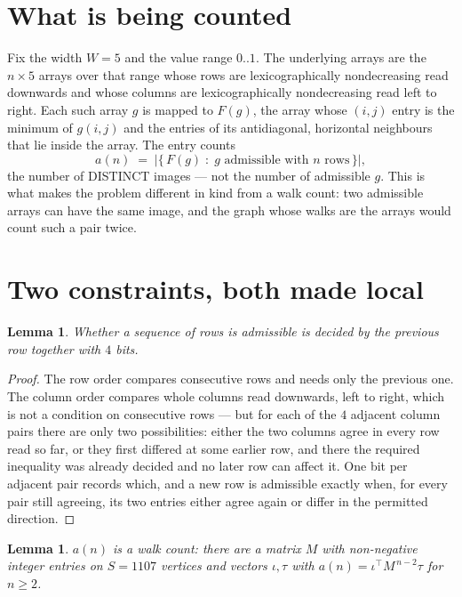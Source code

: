 \documentclass[11pt,a4paper]{article}
\theoremstyle{plain}
\newtheorem{lemma}[theorem]{Lemma}
\theoremstyle{definition}
\begin{document}
\section{What is being counted}

Fix the width $W=5$ and the value range $0..1$. The underlying arrays are the
$n\times5$ arrays over that range whose rows are lexicographically nondecreasing read downwards
and whose columns are lexicographically nondecreasing read left to right. Each such array $g$
is mapped to $F(g)$, the array whose $(i,j)$ entry is the minimum of $g(i,j)$ and the entries
of its antidiagonal, horizontal neighbours that lie inside the array. The entry counts
\[
a(n)\;=\;\bigl|\{\,F(g)\;:\;g\text{ admissible with }n\text{ rows}\,\}\bigr|,
\]
the number of DISTINCT images --- not the number of admissible $g$. This is what makes the
problem different in kind from a walk count: two admissible arrays can have the same image, and
the graph whose walks are the arrays would count such a pair twice.

\section{Two constraints, both made local}

\begin{lemma}\label{lem:local}
Whether a sequence of rows is admissible is decided by the previous row together with
$4$ bits.
\end{lemma}

\begin{proof}
The row order compares consecutive rows and needs only the previous one. The column order
compares whole columns read downwards, left to right, which is not a condition on consecutive
rows --- but for each of the $4$ adjacent column pairs there are only two possibilities:
either the two columns agree in every row read so far, or they first differed at some earlier
row, and there the required inequality was already decided and no later row can affect it. One
bit per adjacent pair records which, and a new row is admissible exactly when, for every pair
still agreeing, its two entries either agree again or differ in the permitted direction.
\end{proof}

\begin{lemma}\label{lem:det}
$a(n)$ is a walk count: there are a matrix $M$ with non-negative integer entries on $S=1107$
vertices and vectors $\iota,\tau$ with $a(n)=\iota^{\!\top}M^{\,n-2}\tau$ for $n\ge2$.
\end{lemma}
\end{document}
